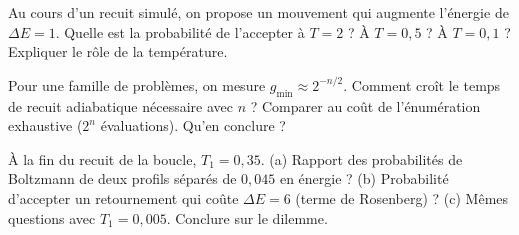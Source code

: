\exercices
\begin{exercice}
Au cours d'un recuit simulé, on propose un mouvement qui augmente l'énergie de $\Delta E=1$. Quelle est la probabilité de l'accepter à $T=2$ ? À $T=0{,}5$ ? À $T=0{,}1$ ? Expliquer le rôle de la température.
\end{exercice}
\begin{exercice}
Pour une famille de problèmes, on mesure $g_{\min}\approx2^{-n/2}$. Comment croît le temps de recuit adiabatique nécessaire avec $n$ ? Comparer au coût de l'énumération exhaustive ($2^n$ évaluations). Qu'en conclure ?
\end{exercice}
\begin{exercice}\label{ex:boltzmann}
À la fin du recuit de la boucle, $T_1=0{,}35$. (a) Rapport des probabilités de Boltzmann de deux profils séparés de $0{,}045$ en énergie ? (b) Probabilité d'accepter un retournement qui coûte $\Delta E=6$ (terme de Rosenberg) ? (c) Mêmes questions avec $T_1=0{,}005$. Conclure sur le dilemme.
\end{exercice}
